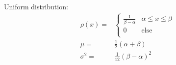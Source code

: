 			\noindent
			Uniform distribution:
			\begin{equation}
				\begin{aligned}
					\rho(x) =& \left\{\begin{array}{ll}
					\frac{1}{\beta-\alpha} & \alpha\le x\le \beta \\
					0 & \text{else} \\
					\end{array}\right. \\
					\mu =& \frac{1}{2}(\alpha+\beta) \\
					\sigma^2 =& \frac{1}{12}(\beta-\alpha)^2 \\
				\end{aligned}
			\end{equation}
